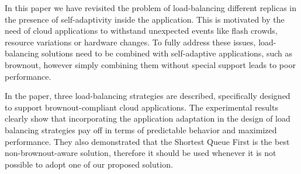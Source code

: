 In this paper we have revisited the problem of load-balancing
different replicas in the presence of self-adaptivity inside the application.
This is motivated by the need of cloud applications to withstand unexpected events
like flash crowds, resource variations or hardware changes.
To fully address these issues, load-balancing solutions need to be combined
with self-adaptive applications, such as brownout, however simply combining
them without special support leads to poor performance.

In the paper, three load-balancing strategies are described, specifically
designed to support brownout-compliant cloud applications.
The experimental results clearly show that
incorporating the application adaptation in the design of load
balancing strategies pay off in terms of predictable behavior and
maximized performance. They also demonstrated that the Shortest Queue
First is the best non-brownout-aware solution, therefore it should be
used whenever it is not possible to adopt one of our proposed solution.

